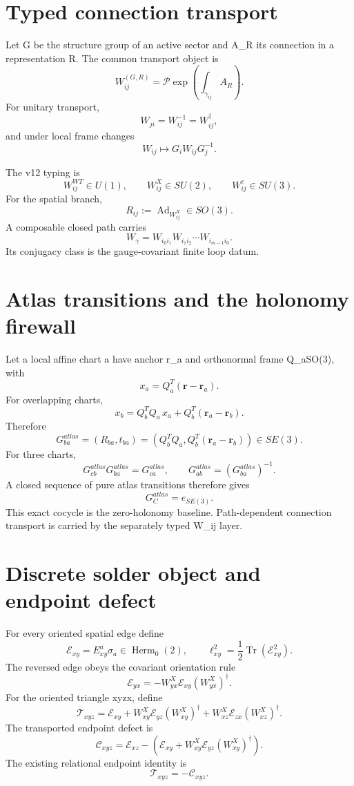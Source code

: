 \documentclass[11pt,a4paper,twoside]{book}
\def\({}%
\def\){}%
\theoremstyle{definition}
\begin{document}
\section{Typed connection transport}

Let \(G\) be the structure group of an active sector and \(A_R\) its connection
in a representation \(R\).  The common transport object is
\[
\boxed{
W_{ij}^{(G,R)}
=\mathcal P\exp\!\left(\int_{\gamma_{ij}}A_R\right).
}
\]
For unitary transport,
\[
\boxed{W_{ji}=W_{ij}^{-1}=W_{ij}^{\dagger}},
\]
and under local frame changes
\[
\boxed{W_{ij}\mapsto G_iW_{ij}G_j^{-1}}.
\]

The v12 typing is
\[
\boxed{
W_{ij}^{WT}\in U(1),
\qquad W_{ij}^{X}\in SU(2),
\qquad W_{ij}^{c}\in SU(3).
}
\]
For the spatial branch,
\[
\boxed{R_{ij}:=\operatorname{Ad}_{W_{ij}^{X}}\in SO(3)}.
\]
A composable closed path carries
\[
\boxed{W_\gamma=W_{i_0i_1}W_{i_1i_2}\cdots W_{i_{m-1}i_0}}.
\]
Its conjugacy class is the gauge-covariant finite loop datum.

\section{Atlas transitions and the holonomy firewall}

Let a local affine chart \(a\) have anchor \(\mathbf r_a\) and orthonormal
frame \(Q_a\in SO(3)\), with
\[
x_a=Q_a^T(\mathbf r-\mathbf r_a).
\]
For overlapping charts,
\[
\boxed{x_b=Q_b^TQ_a\,x_a+Q_b^T(\mathbf r_a-\mathbf r_b)}.
\]
Therefore
\[
\boxed{
G_{ba}^{atlas}
=(R_{ba},t_{ba})
=\left(Q_b^TQ_a,Q_b^T(\mathbf r_a-\mathbf r_b)\right)
\in SE(3).
}
\]
For three charts,
\[
G_{cb}^{atlas}G_{ba}^{atlas}=G_{ca}^{atlas},
\qquad
G_{ab}^{atlas}=(G_{ba}^{atlas})^{-1}.
\]
A closed sequence of pure atlas transitions therefore gives
\[
\boxed{G_C^{atlas}=e_{SE(3)}}.
\]
This exact cocycle is the zero-holonomy baseline.  Path-dependent connection
transport is carried by the separately typed \(W_{ij}\) layer.

\section{Discrete solder object and endpoint defect}

For every oriented spatial edge define
\[
\mathcal E_{xy}=E^a_{xy}\sigma_a\in\operatorname{Herm}_0(2),
\qquad
\ell_{xy}^2=\frac12\operatorname{Tr}(\mathcal E_{xy}^2).
\]
The reversed edge obeys the covariant orientation rule
\[
\boxed{
\mathcal E_{yx}
=-W_{yx}^{X}\mathcal E_{xy}(W_{yx}^{X})^\dagger.
}
\]
For the oriented triangle \(x\to y\to z\to x\), define
\[
\boxed{
\mathcal T_{xyz}
=\mathcal E_{xy}
+W_{xy}^{X}\mathcal E_{yz}(W_{xy}^{X})^\dagger
+W_{xz}^{X}\mathcal E_{zx}(W_{xz}^{X})^\dagger.
}
\]
The transported endpoint defect is
\[
\boxed{
\mathcal C_{xyz}
=\mathcal E_{xz}
-\left(
\mathcal E_{xy}
+W_{xy}^{X}\mathcal E_{yz}(W_{xy}^{X})^\dagger
\right).
}
\]
The existing relational endpoint identity is
\[
\boxed{\mathcal T_{xyz}=-\mathcal C_{xyz}}.
\]
\end{document}
